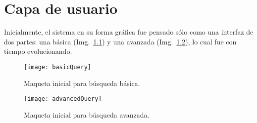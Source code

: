 \chapter{Capa de usuario}

Inicialmente, el sistema en su forma gráfica fue pensado sólo como una interfaz de dos partes: una básica (Img.~\ref{img:basicQuery}) y una avanzada (Img.~\ref{img:advancedQuery}), lo cual fue con tiempo evolucionando.

\begin{figure}[ht!]
	\centering
	\texttt{[image: basicQuery]}
	\caption{Maqueta inicial para búsqueda básica.}
	\label{img:basicQuery}
\end{figure}

\begin{figure}[ht!]
	\centering
	\texttt{[image: advancedQuery]}
	\caption{Maqueta inicial para búsqueda avanzada.}
	\label{img:advancedQuery}
\end{figure}
